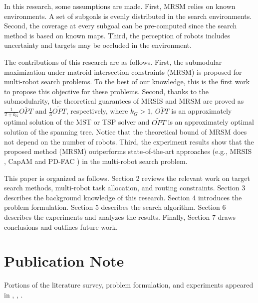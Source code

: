In this research, some assumptions are made. First, MRSM relies on known environments. A set of subgoals is evenly distributed in the search environments.
Second, the coverage at every subgoal can be pre-computed since the search method is based on known maps.
Third, the perception of robots includes uncertainty and targets may be occluded in the environment.

The contributions of this research are as follows.
First,  the submodular maximization under matroid intersection constraints (MRSM) is proposed for multi-robot search problems.
To the best of our knowledge, this is the first work to propose this objective for these problems.
Second, thanks to the submodularity,
the theoretical guarantees of MRSIS \cite{li2024mrsis} and MRSM are proved as $\frac{1}{2+k_G} \overline{OPT}$ and $\frac{1}{3}\widetilde{OPT}$, respectively, where $k_G > 1$, $\overline{OPT}$ is an approximately optimal solution of the MST or TSP solver and $\widetilde{OPT}$ is an approximately optimal solution of the spanning tree.
Notice that the theoretical bound of MRSM does not depend on the number of robots.
Third, the experiment results show that the proposed method (MRSM) outperforms state-of-the-art approaches (e.g., MRSIS \cite{li2024mrsis}, CapAM \cite{paull2022learning} and PD-FAC \cite{sheng2022pd}) in the multi-robot search problem.

This paper is organized as follows. Section 2 reviews the relevant work on target search methods, multi-robot task allocation, and routing constraints. Section 3 describes the background knowledge of this research. Section 4 introduces the problem formulation. Section 5 describes the search algorithm. Section 6 describes the experiments and analyzes the results. Finally, Section 7 draws conclusions and outlines future work.

\section{Publication Note}
Portions of the literature survey, problem formulation, and experiments appeared in \cite{li2024mrsis}, \cite{li2024casmo}, \cite{li2024mrsm}.


